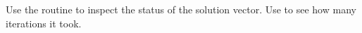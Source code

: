   Use the
  routine  to inspect the status of the
  solution vector. Use  to see how many
  iterations it took.
